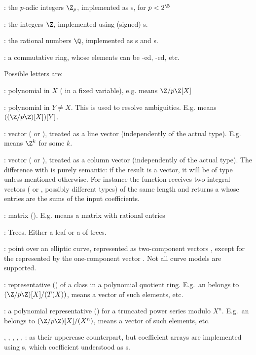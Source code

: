   : the $p$-adic integers $\Z_p$, implemented as s, for $p< 2^{\B}$

  :  the integers $\Z$, implemented using (signed) s.

  :  the rational numbers $\Q$, implemented as s and
s.

  :  a commutative ring, whose elements can be
-ed, -ed, etc.

\noindent Possible letters are:

  : polynomial in $X$ ( in a fixed variable), e.g. 
           means $\Z/p\Z[X]$

  : polynomial in $Y\neq X$. This is used to resolve ambiguities.
           E.g.  means $((\Z/p\Z)[X])[Y]$.

  : vector ( or ), treated as a line vector
  (independently of the actual type). E.g.  means $\Z^k$ for some $k$.

  : vector ( or ), treated as a column vector
  (independently of the actual type). The difference with  is purely
  semantic: if the result is a vector, it will be of type  unless
  mentioned otherwise. For instance the function  receives two
  integral vectors ( or , possibly different types) of the
  same length and returns a  whose entries are the sums of the input
  coefficients.

  : matrix (). E.g.  means a matrix with rational
  entries

  : Trees. Either a leaf or a  of trees.

  : point over an elliptic curve, represented
  as two-component vectors \kbd{[x,y]}, except for the  represented by the
  one-component vector \kbd{[0]}. Not all curve models are supported.

  : representative () of a class in a polynomial quotient ring.
  E.g.~an  belongs to $(\Z/p\Z)[X]/(T(X))$,  means a
  vector of such elements, etc.

  : a polynomial representative () for a truncated power
  series modulo $X^n$. E.g.~an  belongs to $(\Z/p\Z)[X]/(X^n)$,
   means a vector of such elements, etc.

  , , , , , : as their uppercase
  counterpart, but coefficient arrays are implemented using s,
  which coefficient understood as s.

